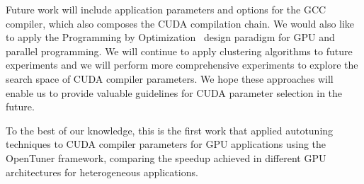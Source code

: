 Future work will include application parameters and options for the GCC
compiler, which also composes the CUDA compilation chain.  We would also like
to apply the Programming by Optimization~\cite{hoos2012programming} design
paradigm for GPU and parallel programming. We will continue to apply clustering
algorithms to future experiments and we will perform more comprehensive
experiments to explore the search space of CUDA compiler parameters. We hope
these approaches will enable us to provide valuable guidelines for CUDA
parameter selection in the future.

To the best of our knowledge, this is the first work that applied autotuning
techniques to CUDA compiler parameters for GPU applications using the OpenTuner
framework, comparing the speedup achieved in different GPU architectures for
heterogeneous applications.
